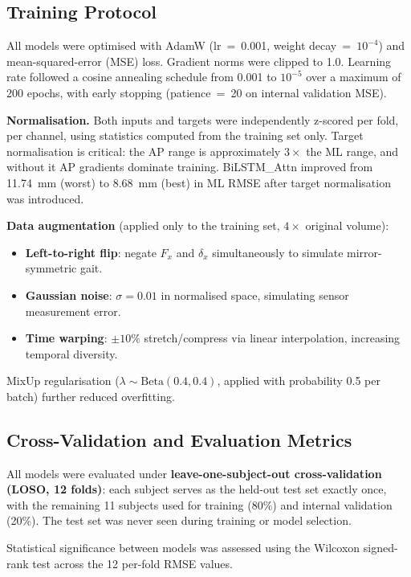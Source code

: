 \documentclass[preprint,12pt]{elsarticle}
\begin{document}
\subsection{Training Protocol}
\label{subsec:training}

All models were optimised with AdamW (lr~=~0.001, weight decay~=~$10^{-4}$) and
mean-squared-error (MSE) loss.
Gradient norms were clipped to 1.0.
Learning rate followed a cosine annealing schedule from 0.001 to $10^{-5}$ over a
maximum of 200 epochs, with early stopping (patience~=~20 on internal validation
MSE).

\noindent\textbf{Normalisation.}
Both inputs and targets were independently z-scored per fold, per channel, using
statistics computed from the training set only.
Target normalisation is critical: the AP range is approximately $3\times$ the ML
range, and without it AP gradients dominate training.
BiLSTM\_Attn improved from 11.74~mm (worst) to 8.68~mm (best) in ML RMSE after
target normalisation was introduced.

\noindent\textbf{Data augmentation} (applied only to the training set, $4\times$
original volume):
\begin{itemize}
  \item \textbf{Left-to-right flip}: negate $F_x$ and $\delta_x$ simultaneously to
        simulate mirror-symmetric gait.
  \item \textbf{Gaussian noise}: $\sigma = 0.01$ in normalised space, simulating
        sensor measurement error.
  \item \textbf{Time warping}: $\pm 10\%$ stretch/compress via linear
        interpolation, increasing temporal diversity.
\end{itemize}
MixUp regularisation ($\lambda \sim \mathrm{Beta}(0.4, 0.4)$, applied with
probability 0.5 per batch) further reduced overfitting.

\subsection{Cross-Validation and Evaluation Metrics}
\label{subsec:eval}

All models were evaluated under \textbf{leave-one-subject-out cross-validation
(LOSO, 12 folds)}: each subject serves as the held-out test set exactly once,
with the remaining 11 subjects used for training (80\%) and internal validation
(20\%).
The test set was never seen during training or model selection.

Statistical significance between models was assessed using the Wilcoxon
signed-rank test across the 12 per-fold RMSE values.
\end{document}
